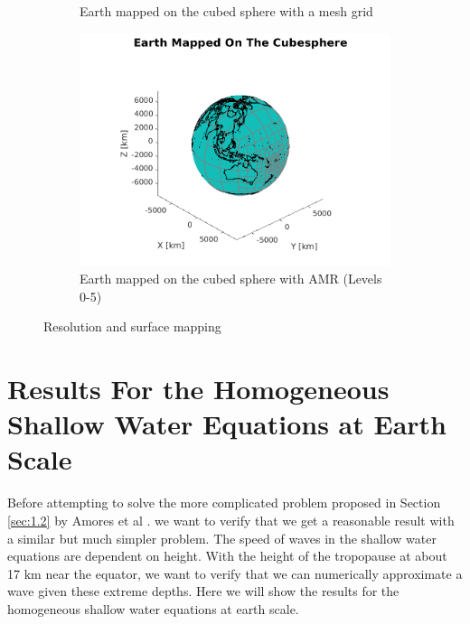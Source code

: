 \documentclass[twoside]{bsu-ms}
\begin{document}
\begin{figure}[!htbp]
\begin{subfigure}{\textwidth}
  \caption{Earth mapped on the cubed sphere with a mesh grid}
\end{subfigure}
\medskip
\begin{subfigure}{\textwidth}
  \centering
\includegraphics[height=0.27\textheight,clip=True,trim=1.8cm 0.6cm 2.6cm 2.6cm]{images/earth_cube_amr.png}
  \caption{Earth mapped on the cubed sphere with AMR (Levels 0-5)}
\end{subfigure}
\caption{Resolution and surface mapping}
\label{fig:2.2}
\end{figure}



%
%
\chapter{Results For the Homogeneous Shallow Water Equations at Earth Scale}\label{ch:3}
Before attempting to solve the more complicated problem proposed in Section \ref{sec:1.2} by Amores et al \cite{amores2022numerical}. we want to verify that we get a reasonable result with a similar but much simpler problem. The speed of waves in the shallow water equations are dependent on height. With the height of the tropopause at about 17 $\mathrm{km}$ near the equator, we want to verify that we can numerically approximate a wave given these extreme depths. Here we will show the results for the homogeneous shallow water equations at earth scale. 
\end{document}
